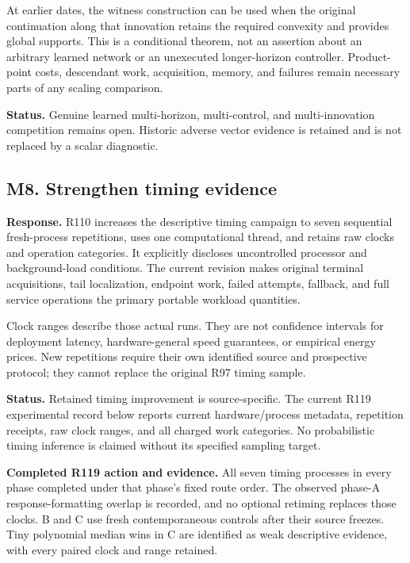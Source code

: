 At earlier dates, the witness construction can be used when the original continuation along that innovation retains the required convexity and provides global supports. This is a conditional theorem, not an assertion about an arbitrary learned network or an unexecuted longer-horizon controller. Product-point costs, descendant work, acquisition, memory, and failures remain necessary parts of any scaling comparison.

\textbf{Status.} Genuine learned multi-horizon, multi-control, and multi-innovation competition remains open. Historic adverse vector evidence is retained and is not replaced by a scalar diagnostic.

\hypertarget{m8.-strengthen-timing-evidence}{%
\subsection{M8. Strengthen timing evidence}\label{m8.-strengthen-timing-evidence}}

\textbf{Response.} R110 increases the descriptive timing campaign to seven sequential fresh-process repetitions, uses one computational thread, and retains raw clocks and operation categories. It explicitly discloses uncontrolled processor and background-load conditions. The current revision makes original terminal acquisitions, tail localization, endpoint work, failed attempts, fallback, and full service operations the primary portable workload quantities.

Clock ranges describe those actual runs. They are not confidence intervals for deployment latency, hardware-general speed guarantees, or empirical energy prices. New repetitions require their own identified source and prospective protocol; they cannot replace the original R97 timing sample.

\textbf{Status.} Retained timing improvement is source-specific. The current R119 experimental record below reports current hardware/process metadata, repetition receipts, raw clock ranges, and all charged work categories. No probabilistic timing inference is claimed without its specified sampling target.

\textbf{Completed R119 action and evidence.} All seven timing processes in every phase completed under that phase's fixed route order. The observed phase-A response-formatting overlap is recorded, and no optional retiming replaces those clocks. B and C use fresh contemporaneous controls after their source freezes. Tiny polynomial median wins in C are identified as weak descriptive evidence, with every paired clock and range retained.

